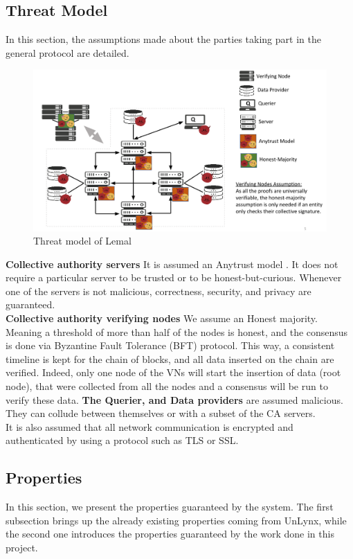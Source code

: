 \documentclass{article}
\begin{document}
\subsection{Threat Model}
In this section, the assumptions made about the parties taking part in the general protocol are detailed.
\begin{figure}[H]
\center
\includegraphics[scale=0.5]{img/threatLemal.png}
\caption{Threat model of Lemal}
\end{figure}
\textbf{Collective authority servers} It is assumed an Anytrust model \cite{anytrust}. It does not require a particular server to be trusted or to be honest-but-curious. Whenever one of the servers is not malicious, correctness, security, and privacy are guaranteed.\\
\textbf{Collective authority verifying nodes} We assume an Honest majority. Meaning a threshold of more than half of the nodes is honest, and the consensus is done via Byzantine Fault Tolerance (BFT) protocol. This way, a consistent timeline is kept for the chain of blocks, and all data inserted on the chain are verified. Indeed, only one node of the VNs will start the insertion of data (root node), that were collected from all the nodes and a consensus will be run to verify these data.
\textbf{The Querier, and Data providers} are assumed malicious. They can collude between themselves or with a subset of the CA servers.\\
It is also assumed that all network communication is encrypted and authenticated by using a protocol such as TLS or SSL.
\subsection{Properties}
In this section, we present the properties guaranteed by the system. The first subsection brings up the already existing properties coming from UnLynx, while the second one introduces the properties guaranteed by the work done in this project.\\
\end{document}

